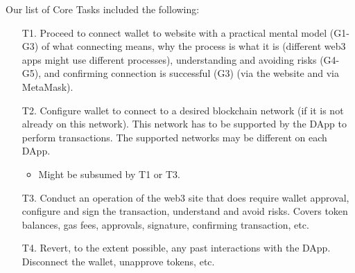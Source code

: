 \documentclass[conference]{IEEEtran}
\begin{document}
\vspace{1em}
\noindent
Our list of Core Tasks included the following:
\begin{enumerate}
	\item[T1.] Proceed to connect wallet to website with a practical mental model (G1-G3) of what connecting means, why the process is what it is (different web3 apps might use different processes), understanding and avoiding risks (G4-G5), and confirming connection is successful (G3) (via the website and via MetaMask).

	\item[T2.] Configure wallet to connect to a desired blockchain network (if it is not already on this network). This network has to be supported by the DApp to perform transactions. The supported networks may be different on each DApp. 
	\begin{itemize}
		\item Might be subsumed by T1 or T3.
	\end{itemize}

	\item[T3.] Conduct an operation of the web3 site that does require wallet approval, configure and sign the transaction, understand and avoid risks. Covers token balances, gas fees, approvals, signature, confirming transaction, etc.

	\item[T4.] Revert, to the extent possible, any past interactions with the DApp. Disconnect the wallet, unapprove tokens, etc. 
\end{enumerate}
\end{document}
